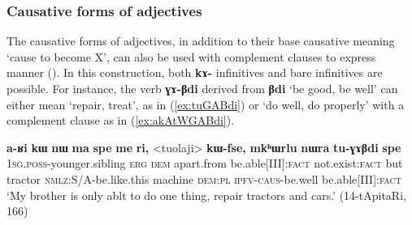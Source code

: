 \documentclass[oneside,a4paper,11pt]{article}
\newcommand{\ipa}[1]{\textbf{\phon#1}} %
\newcommand{\jpg}[2]{\ipa{#1} `#2'} %
\newcommand{\refb}[1]{(\ref{#1})}
\begin{document}
 
% 
%

\subsubsection{Causative forms of adjectives}
The causative forms of adjectives, in addition to their base causative meaning `cause to become X', can also be used with complement clauses to express manner (\citealt[184]{jacques15causative}). In this construction, both  \ipa{kɤ-} infinitives and bare infinitives are possible. For instance, the verb \ipa{ɣɤ-βdi} derived from \jpg{βdi}{be good, be well} can either mean `repair, treat', as in \refb{ex:tuGABdi} or `do well, do properly' with a complement clause as in \refb{ex:akAtWGABdi}.

\begin{exe}
\ex \label{ex:tuGABdi}
 \gll \ipa{a-ʁi} 	\ipa{kɯ} 	\ipa{nɯ} 	\ipa{ma} 	\ipa{spe} 	\ipa{me} 	\ipa{ri,} 	<tuolaji> 	\ipa{kɯ-fse,} 	\ipa{mkʰɯrlu} 	\ipa{nɯra} 	\ipa{tu-ɣɤβdi} 	\ipa{spe} \\
 \textsc{1sg.poss}-younger.sibling \textsc{erg} \textsc{dem} apart.from be.able[III]:\textsc{fact} not.exist:\textsc{fact} but tractor \textsc{nmlz}:S/A-be.like.this machine \textsc{dem:pl} \textsc{ipfv-caus}-be.well be.able[III]:\textsc{fact} \\
 \glt `My brother is only ablt to do one thing, repair tractors and cars.' (14-tApitaRi, 166)
\end{exe}
\end{document}
